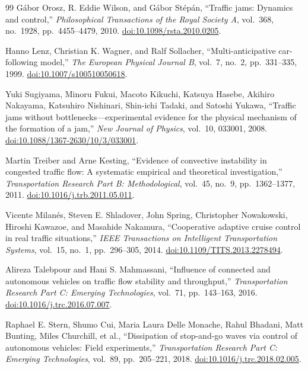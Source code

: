 \documentclass[11pt,a4paper,openany]{book}
\numberwithin{equation}{chapter}
\numberwithin{figure}{chapter}
\numberwithin{table}{chapter}
\begin{document}
\begin{thebibliography}{99}
Gábor Orosz, R. Eddie Wilson, and Gábor Stépán,
``Traffic jams: Dynamics and control,''
\emph{Philosophical Transactions of the Royal Society A}, vol.~368, no.~1928, pp.~4455--4479, 2010.
\href{https://doi.org/10.1098/rsta.2010.0205}{doi:10.1098/rsta.2010.0205}.

Hanno Lenz, Christian K. Wagner, and Ralf Sollacher,
``Multi-anticipative car-following model,''
\emph{The European Physical Journal B}, vol.~7, no.~2, pp.~331--335, 1999.
\href{https://doi.org/10.1007/s100510050618}{doi:10.1007/s100510050618}.

Yuki Sugiyama, Minoru Fukui, Macoto Kikuchi, Katsuya Hasebe, Akihiro Nakayama,
Katsuhiro Nishinari, Shin-ichi Tadaki, and Satoshi Yukawa,
``Traffic jams without bottlenecks---experimental evidence for the physical mechanism of the formation of a jam,''
\emph{New Journal of Physics}, vol.~10, 033001, 2008.
\href{https://doi.org/10.1088/1367-2630/10/3/033001}{doi:10.1088/1367-2630/10/3/033001}.

Martin Treiber and Arne Kesting,
``Evidence of convective instability in congested traffic flow: A systematic empirical and theoretical investigation,''
\emph{Transportation Research Part B: Methodological}, vol.~45, no.~9, pp.~1362--1377, 2011.
\href{https://doi.org/10.1016/j.trb.2011.05.011}{doi:10.1016/j.trb.2011.05.011}.

Vicente Milanés, Steven E. Shladover, John Spring, Christopher Nowakowski,
Hiroshi Kawazoe, and Masahide Nakamura,
``Cooperative adaptive cruise control in real traffic situations,''
\emph{IEEE Transactions on Intelligent Transportation Systems}, vol.~15, no.~1, pp.~296--305, 2014.
\href{https://doi.org/10.1109/TITS.2013.2278494}{doi:10.1109/TITS.2013.2278494}.

Alireza Talebpour and Hani S. Mahmassani,
``Influence of connected and autonomous vehicles on traffic flow stability and throughput,''
\emph{Transportation Research Part C: Emerging Technologies}, vol.~71, pp.~143--163, 2016.
\href{https://doi.org/10.1016/j.trc.2016.07.007}{doi:10.1016/j.trc.2016.07.007}.

Raphael E. Stern, Shumo Cui, Maria Laura Delle Monache, Rahul Bhadani,
Matt Bunting, Miles Churchill, et al.,
``Dissipation of stop-and-go waves via control of autonomous vehicles: Field experiments,''
\emph{Transportation Research Part C: Emerging Technologies}, vol.~89, pp.~205--221, 2018.
\href{https://doi.org/10.1016/j.trc.2018.02.005}{doi:10.1016/j.trc.2018.02.005}.


\end{thebibliography}
\end{document}
